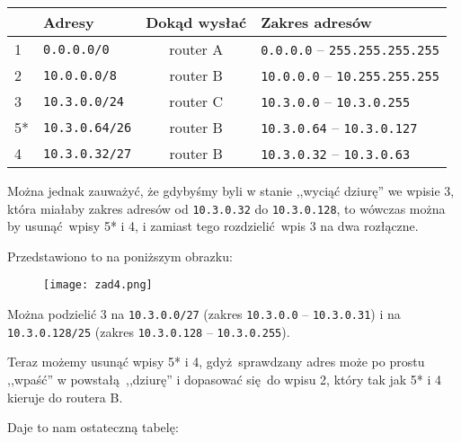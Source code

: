 \documentclass[a4paper, oneside]{article}
\begin{document}
\begin{description}
{        \begin{table}[H]
        \centering
        \begin{tabular}{|l|l|c|l|}
        \hline
            & \textbf{Adresy}     
            & \textbf{Dokąd wysłać} 
            & \textbf{Zakres adresów} \\ \hline \hline
        1   & \texttt{0.0.0.0/0}
            & \cellcolor{blue!35} router A 
            & \texttt{0.0.0.0} -- \texttt{255.255.255.255} \\ \hline
        2   & \texttt{10.0.0.0/8}
            & \cellcolor{green!35} router B
            & \texttt{10.0.0.0} -- \texttt{10.255.255.255} \\ \hline
        3   & \texttt{10.3.0.0/24}
            & \cellcolor{red!35} router C
            & \texttt{10.3.0.0} -- \texttt{10.3.0.255} \\ \hline
        5*  & \texttt{10.3.0.64/26}
            & \cellcolor{green!35} router B
            & \texttt{10.3.0.64} -- \texttt{10.3.0.127} \\ \hline
        4   & \texttt{10.3.0.32/27}
            & \cellcolor{green!35} router B
            & \texttt{10.3.0.32} -- \texttt{10.3.0.63} \\ \hline
        \end{tabular}
        \end{table}

        Można jednak zauważyć, że gdybyśmy byli w stanie ,,wyciąć dziurę'' we
        wpisie 3, która miałaby zakres adresów od \texttt{10.3.0.32} do
        \texttt{10.3.0.128}, to wówczas można by usunąć wpisy 5* i 4, i zamiast 
        tego rozdzielić wpis 3 na dwa rozłączne.

        Przedstawiono to na poniższym obrazku:

        \begin{figure}[H]
            \centering
            \texttt{[image: zad4.png]}
        \end{figure}
        
        Można podzielić 3 na \texttt{10.3.0.0/27} (zakres 
        \texttt{10.3.0.0} -- \texttt{10.3.0.31}) i na 
        \texttt{10.3.0.128/25} (zakres \texttt{10.3.0.128} 
        -- \texttt{10.3.0.255}).

        Teraz możemy usunąć wpisy 5* i 4, gdyż sprawdzany adres może po prostu
        ,,wpaść'' w powstałą ,,dziurę'' i dopasować się do wpisu 2, który tak jak 5* i 4 kieruje do routera B.

        Daje to nam ostateczną tabelę:

}
\end{description}
\end{document}
